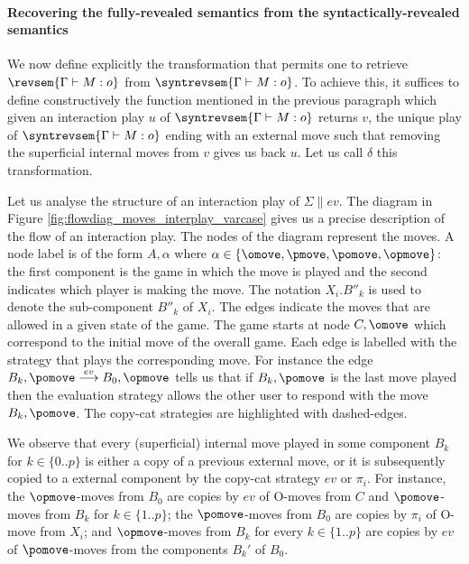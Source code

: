     \paragraph{Recovering the fully-revealed semantics from the syntactically-revealed semantics}


    We now define explicitly the transformation that permits one to retrieve $\revsem{\Gamma \vdash M : o}$ from $\syntrevsem{\Gamma \vdash M : o}$. To achieve this, it suffices to define constructively the function mentioned in the previous paragraph which given an interaction play $u$ of $\syntrevsem{\Gamma \vdash M : o}$ returns $v$, the unique play of $\syntrevsem{\Gamma \vdash M : o}$ ending with an external move such that removing the superficial internal moves from $v$ gives us back $u$. Let us call $\delta$ this transformation.

    Let us analyse the structure of an interaction play of $\Sigma \|  ev$. The diagram in Figure \ref{fig:flowdiag_moves_interplay_varcase} gives us a precise description of the flow of an interaction play. The nodes of the diagram represent the moves. A node label is of the form $A,\alpha$ where $\alpha \in \{\omove,\pmove,\pomove,\opmove\}$: the first component is the game in which the move is played and the second indicates which player is making the move. The notation $X_i.B''_k$ is used to denote the sub-component $B''_k$ of $X_i$. The edges indicate the moves that are allowed in a given state of the game. The game starts at node $C,\omove$ which correspond to the initial move of the overall game. Each edge is labelled with the strategy that plays the corresponding move. For instance the edge $B_k,\pomove \stackrel{ev}\longrightarrow B_0,\opmove$ tells us that if $B_k,\pomove$ is the last move played then the evaluation strategy allows the other user to respond with the move $B_k,\pomove$. The copy-cat strategies are highlighted with dashed-edges.

    We observe that every (superficial) internal move played in some component $B_k$ for $k\in \{0..p\}$ is either a copy of a previous external move, or it is subsequently copied to a external component by the copy-cat strategy $ev$ or $\pi_i$.  For instance, the $\opmove$-moves from $B_0$ are copies by $ev$ of O-moves from $C$ and $\pomove$-moves from $B_k$ for $k \in \{1..p\}$; the $\pomove$-moves from $B_0$ are copies by $\pi_i$ of O-move from $X_i$; and $\opmove$-moves from $B_k$ for every $k \in \{1..p\}$ are copies by $ev$ of $\pomove$-moves from the components $B_k'$ of $B_0$.

